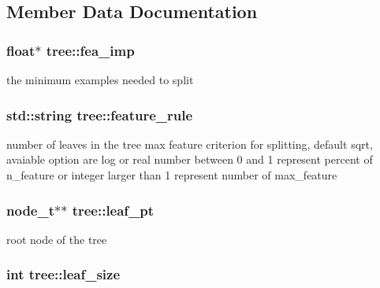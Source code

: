 \subsection{Member Data Documentation}
\hypertarget{classtree_ad335e57b2f4f2326825694311bcc69e7}{
\subsubsection[{fea\+\_\+imp}]{\setlength{\rightskip}{0pt plus 5cm}float$\ast$ tree\+::fea\+\_\+imp\hspace{0.3cm}{\ttfamily [protected]}}}\label{classtree_ad335e57b2f4f2326825694311bcc69e7}
the minimum examples needed to split \hypertarget{classtree_a5aba3b77a347165517a20d5fab94382d}{
\subsubsection[{feature\+\_\+rule}]{\setlength{\rightskip}{0pt plus 5cm}std\+::string tree\+::feature\+\_\+rule\hspace{0.3cm}{\ttfamily [protected]}}}\label{classtree_a5aba3b77a347165517a20d5fab94382d}
number of leaves in the tree max feature criterion for splitting, default {\ttfamily sqrt}, avaiable option are {\ttfamily log} or real number between 0 and 1 represent percent of {\ttfamily n\+\_\+feature} or integer larger than 1 represent number of {\ttfamily max\+\_\+feature} \hypertarget{classtree_a30ebe7c91d8a7c68e05bd40b06867f95}{
\subsubsection[{leaf\+\_\+pt}]{\setlength{\rightskip}{0pt plus 5cm}node\+\_\+t$\ast$$\ast$ tree\+::leaf\+\_\+pt\hspace{0.3cm}{\ttfamily [protected]}}}\label{classtree_a30ebe7c91d8a7c68e05bd40b06867f95}
root node of the tree \hypertarget{classtree_a551919e1402a700821694297623017fc}{
\subsubsection[{leaf\+\_\+size}]{\setlength{\rightskip}{0pt plus 5cm}int tree\+::leaf\+\_\+size\hspace{0.3cm}{\ttfamily [protected]}}}\label{classtree_a551919e1402a700821694297623017fc}

